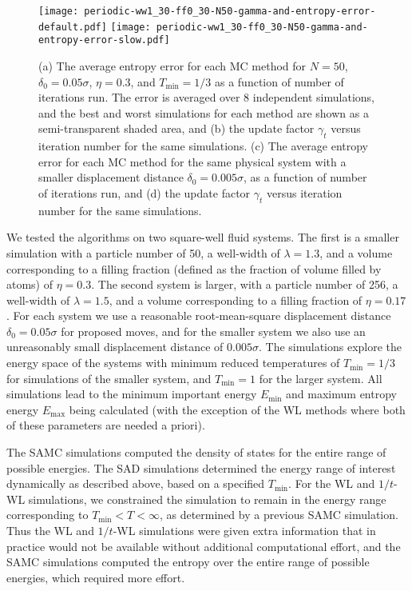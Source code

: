 \documentclass[letterpaper,twocolumn,amsmath,amssymb,pre,aps,10pt]{revtex4-1}
\begin{document}
\begin{figure*}
  \texttt{[image: periodic-ww1\_30-ff0\_30-N50-gamma-and-entropy-error-default.pdf]}%
\texttt{[image: periodic-ww1\_30-ff0\_30-N50-gamma-and-entropy-error-slow.pdf]}
  \caption{(a) The average entropy error for each MC method for $N=50$,
               $\delta_0 = 0.05\sigma$, $\eta = 0.3$, and $T_{\min} = 1/3$
               as a function of number of iterations run. The error is
               averaged over 8 independent simulations, and the best
               and worst simulations for each method are shown as a
               semi-transparent shaded area, and
           (b) the update factor $\gamma_t$ versus iteration number
               for the same simulations.
           (c) The average entropy error for each MC method for the
               same physical system with a smaller displacement distance
               $\delta_0 = 0.005\sigma$,
               as a function of number of iterations run, and
           (d) the update factor $\gamma_t$ versus iteration number
               for the same simulations.
  }\label{fig:fast-slow-gamma}
\end{figure*}

We tested the algorithms on two square-well fluid systems.  The first
is a smaller simulation with a particle number of 50, a well-width of
$\lambda = 1.3$, and a volume corresponding to a filling fraction
(defined as the fraction of volume filled by atoms) of $\eta =
0.3$. The second system is larger, with a particle number of 256, a
well-width of $\lambda = 1.5$, and a volume corresponding to a filling
fraction of $\eta = 0.17$.  For each system we use a reasonable
root-mean-square displacement distance $\delta_0 = 0.05\sigma$ for
proposed moves, and for the smaller system we also use an unreasonably
small displacement distance of $0.005\sigma$. The simulations explore
the energy space of the systems with minimum reduced temperatures of
$T_{\text{min}} = 1/3$ for simulations of the smaller system, and
$T_{\min}=1$ for the larger system.  All simulations lead to the
minimum important energy $E_{\min}$ and maximum entropy energy
$E_{\max}$ being calculated (with the exception of the WL methods
where both of these parameters are needed a priori).

The SAMC simulations
computed the density of states for the entire range of possible
energies.  The SAD simulations determined the energy range of interest
dynamically as described above, based on a specified $T_{\min}$.  For
the WL and $1/t$-WL simulations, we constrained the simulation to
remain in the energy range corresponding to $T_{\min} < T < \infty$,
as determined by a previous SAMC simulation.  Thus the WL and $1/t$-WL
simulations were given extra information that in practice would not be
available without additional computational effort, and the SAMC simulations
computed the entropy over the entire range of possible energies, which
required more effort.
\end{document}
